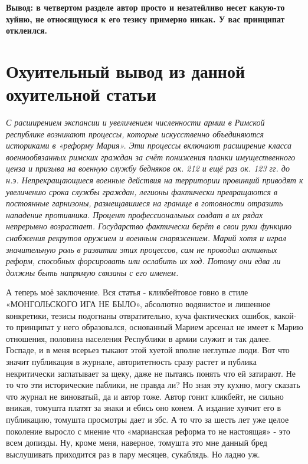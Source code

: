 \textbf{Вывод: в четвертом разделе автор просто и незатейливо несет какую-то хуйню, не относящуюся к его тезису примерно никак. У вас принципат отклеился.
}

\section{Охуительный вывод из данной охуительной статьи}

\textit{С расширением экспансии и увеличением численности армии в Римской республике возникают процессы, которые искусственно объединяются историками в «реформу Мария». Эти процессы включают расширение класса военнообязанных римских граждан за счёт понижения планки имущественного ценза и призыва на военную службу бедняков ок. 212 и ещё раз ок. 123 гг. до н.э. Непрекращающиеся военные действия на территории провинций приводят к увеличению срока службы граждан, легионы фактически превращаются в постоянные гарнизоны, размещавшиеся на границе в готовности отразить нападение противника. Процент профессиональных солдат в их рядах непрерывно возрастает. Государство фактически берёт в свои руки функцию снабжения рекрутов оружием и военным снаряжением. Марий хотя и играл значительную роль в развитии этих процессов, сам не проводил активных реформ, способных форсировать или ослабить их ход. Потому они едва ли должны быть напрямую связаны с его именем.
}

А теперь моё заключение. Вся статья - кликбейтовое говно в стиле «МОНГОЛЬСКОГО ИГА НЕ БЫЛО», абсолютно водянистое и лишенное конкретики, тезисы подогнаны отвратительно, куча фактических ошибок, какой-то принципат у него образовался, основанный Марием арсенал не имеет к Марию отношения, половина населения Республики в армии служит и так далее. Госпаде, и в меня всерьез тыкают этой хуетой вполне неглупые люди. Вот что значит публикация в журнале, авторитетность сразу растет и публика некритически заглатывает за щеку, даже не пытаясь понять что ей затирают. Не то что эти исторические паблики, не правда ли? Но зная эту кухню, могу сказать что журнал не виноватый, да и автор тоже. Автор гонит кликбейт, не сильно вникая, томушта платят за знаки и ебись оно конем. А издание хуячит его в публикацию, томушта просмотры дает и збс. А то что за шесть лет уже целое поколение выросло с мнение что «марианская реформа то не настоящая» - это всем допизды. Ну, кроме меня, наверное, томушта это мне данный бред выслушивать приходится раз в пару месяцев, сукаблядь. Но ладно уж. 

